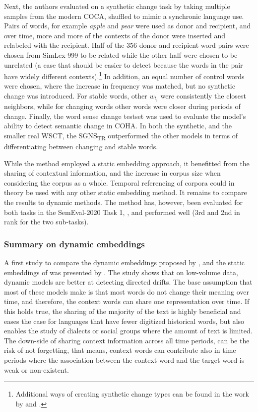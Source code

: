 \documentclass[output=paper]{langsci/langscibook}
\begin{document}
Next, the authors evaluated on a synthetic change task by taking multiple samples from the modern COCA, shuffled to mimic a synchronic language use. Pairs of words, for example \textit{apple} and \textit{pear} were used as donor and recipient, and over time, more and more of the contexts of the donor were inserted and relabeled with the recipient. Half of the 356 donor and recipient word pairs were chosen from SimLex-999  \citep{hill2015simlex} to be related while the other half were chosen to be unrelated (a case that should be easier to detect because the words in the pair have widely different contexts).\footnote{Additional ways of creating synthetic change types can be found in the work by \citet{shoemark-etal-2019-room} and \citet{schlechtwegwalde20}.} In addition, an equal number of control words were chosen, where the increase in frequency was matched, but no synthetic change was introduced. For stable words, other $w_{t_i}$ were consistently the closest neighbors, while for changing words other words were closer during periods of change. 
Finally, the word sense change testset \citep[WSCT;][]{tahmasebi-ranlp17} was used to evaluate the model's ability to detect semantic change in COHA. In both the synthetic, and the smaller real WSCT, the SGNS\textsubscript{TR} outperformed the other models in terms of differentiating between changing and stable words. 

 While the method employed a static embedding approach, it benefitted from the sharing of contextual information, and the increase in corpus size when considering the corpus as a whole.  Temporal referencing of corpora could in theory be used with any other static embedding method. It remains to compare the results to dynamic methods. The method has, however, been evaluated for both tasks in the SemEval-2020 Task 1, \citep{zhou-etal-2020-temporalteller}, and performed well (3rd and 2nd in rank for the two sub-tasks).


 \subsubsection{Summary on dynamic embeddings}A first study to compare the dynamic embeddings proposed by \citet{rudolphb18-dynamicembforlangevo}, \citet{bamler17} and the static embeddings of \citet{kim-etal-2014-temporal} was presented by \citet{montariola19}. The study shows that on low-volume data, dynamic models are better at detecting directed drifts. The base assumption that most of these models make is that most words do not change their meaning over time, and therefore, the context words can share one representation over time. If this holds true, the sharing of the majority of the text is highly beneficial and eases the case for languages that have fewer digitized historical words, but also enables the study of dialects or social groups where the amount of text is limited. The down-side of sharing context information across all time periods, can be the risk of not forgetting, that means, context words can contribute also in time periods where the association between the context word and the target word is weak or non-existent.
\end{document}
